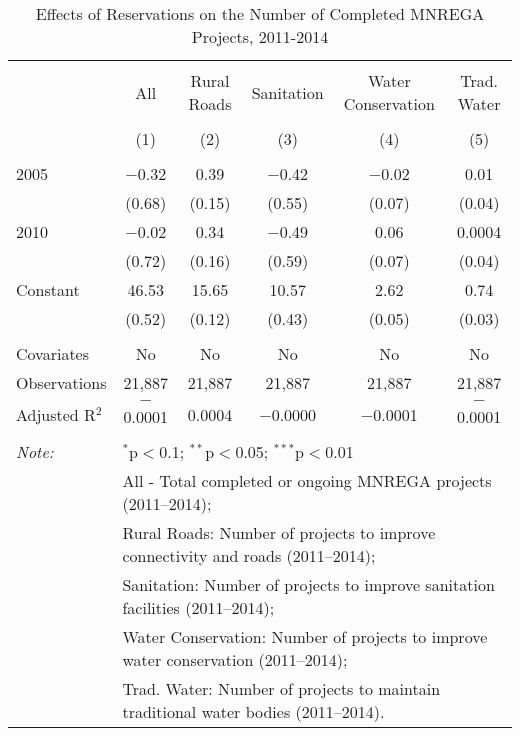 
\begin{table}[!htbp] \centering 
  \caption{Effects of Reservations on the Number of Completed MNREGA Projects, 2011-2014} 
  \label{main_mnrega_up_2005_2010} 
\scriptsize 
\begin{tabular}{@{\extracolsep{0pt}}lccccc} 
\\[-1.8ex]\hline 
\hline \\[-1.8ex] 
 & All & Rural Roads & Sanitation & Water Conservation & Trad. Water \\ 
\\[-1.8ex] & (1) & (2) & (3) & (4) & (5)\\ 
\hline \\[-1.8ex] 
 2005 & $-$0.32 & 0.39 & $-$0.42 & $-$0.02 & 0.01 \\ 
  & (0.68) & (0.15) & (0.55) & (0.07) & (0.04) \\ 
  2010 & $-$0.02 & 0.34 & $-$0.49 & 0.06 & 0.0004 \\ 
  & (0.72) & (0.16) & (0.59) & (0.07) & (0.04) \\ 
  Constant & 46.53 & 15.65 & 10.57 & 2.62 & 0.74 \\ 
  & (0.52) & (0.12) & (0.43) & (0.05) & (0.03) \\ 
 \hline \\[-1.8ex] 
Covariates & No & No & No & No & No \\ 
Observations & 21,887 & 21,887 & 21,887 & 21,887 & 21,887 \\ 
Adjusted R$^{2}$ & $-$0.0001 & 0.0004 & $-$0.0000 & $-$0.0001 & $-$0.0001 \\ 
\hline 
\hline \\[-1.8ex] 
\textit{Note:}  & \multicolumn{5}{l}{$^{*}$p$<$0.1; $^{**}$p$<$0.05; $^{***}$p$<$0.01} \\ 
 & \multicolumn{5}{l}{All - Total completed or ongoing MNREGA projects (2011--2014);} \\ 
 & \multicolumn{5}{l}{Rural Roads: Number of projects to improve connectivity and roads (2011--2014);} \\ 
 & \multicolumn{5}{l}{Sanitation:  Number of projects to improve sanitation facilities  (2011--2014);} \\ 
 & \multicolumn{5}{l}{Water Conservation: Number of projects to improve water conservation (2011--2014);} \\ 
 & \multicolumn{5}{l}{Trad. Water: Number of projects to maintain traditional water bodies (2011--2014).} \\ 
\end{tabular} 
\end{table} 
